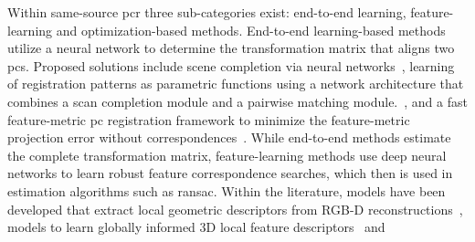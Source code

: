 Within same-source \gls{pcr} three sub-categories exist: end-to-end learning, feature-learning and optimization-based methods. End-to-end learning-based methods utilize a neural network to determine the transformation matrix that aligns two \gls{pc}s. Proposed solutions include scene completion via neural networks~\cite{extreme-relative-pose-estimation-for-rgb-d-scans-via-scene-completion}, 
learning of registration patterns as parametric functions using a network architecture that combines a scan completion module and a pairwise matching module.~\cite{non-rigid-point-set-registration-networks},
and a fast feature-metric \gls{pc} registration framework to minimize the feature-metric projection error without correspondences~\cite{feature-metric-registration:-a-fast-semi-supervised-approach-for-robust-point-cloud-registration-without-correspondences}.
While end-to-end methods estimate the complete transformation matrix, feature-learning methods use deep
neural networks to learn robust feature correspondence searches, which then is used in estimation algorithms such as \gls{ransac}. Within the literature, models have been developed that extract local geometric descriptors from RGB-D reconstructions~\cite{3dmatch:-learning-local-geometric-descriptors-from-rgb-d-reconstructions}, 
models to learn globally informed 3D local feature descriptors~\cite{ppfnet:-global-context-aware-local-features-for-robust-3d-point-matching} and 











